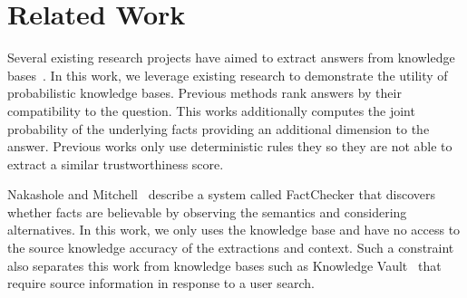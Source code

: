 

\section{Related Work}

Several existing research projects have aimed to extract answers from knowledge bases~\cite{yahya2012natural,yao2014information}.
In this work, we leverage existing research to demonstrate the utility of probabilistic knowledge bases.
Previous methods rank answers by their compatibility to the question.
This works additionally computes the joint probability of the underlying facts providing an additional dimension to the answer.
Previous works only use deterministic rules they so they are not able to extract a similar trustworthiness score.

Nakashole and Mitchell~\cite{nakashole2014languageaware} describe a system
called FactChecker that discovers whether facts are believable by observing the
semantics and considering alternatives. 
In this work, we only uses the knowledge base and have no access to the source
knowledge accuracy of the extractions and context.
Such a constraint also separates this work from knowledge bases such as
Knowledge Vault~\cite{dong2014knowledge} that require source information in
response to a user search.


